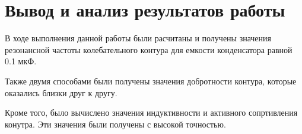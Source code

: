 \section{Вывод и анализ результатов работы}
В ходе выполнения данной работы были расчитаны и получены
значения резонансной частоты колебательного контура для емкости
конденсатора равной 0.1 мкФ.

Также двумя способами были получены значения добротности контура,
которые оказались близки друг к другу.

Кроме того, было вычислено значения индуктивности и
активного сопртивления конутра.
Эти значения были получены с высокой точностью.
